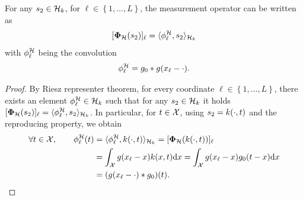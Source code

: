 \documentclass[12pt]{article}
\begin{document}
            {
            \begin{proposition}
                \label{prop:phihh}
                For any $s_2 \in \mathcal{H}_k$, for $\ell \in \left\{ 1, \dots, L \right\}$, the measurement operator can be written as
                \begin{equation}
                    \label{eq:defPhihStar}
                    [\bm{\Phi}_\mathcal{H}(s_2)]_\ell = \langle \phi^\mathcal{H}_\ell, s_2 \rangle_{\mathcal{H}_k}
                \end{equation}
                with $\phi^\mathcal{H}_\ell$ being the convolution
                \begin{equation*}
                    \phi^\mathcal{H}_\ell = g_0 * g(x_\ell - \cdot).
                \end{equation*}
            \end{proposition}
            \begin{proof}
                

                By Riesz representer theorem, for every coordinate  $\ell \in \left\{1, \dots, L \right\}$, there exists an element $\phi^\mathcal{H}_\ell \in \mathcal{H}_k$ such that for any $s_2 \in \mathcal{H}_k$ it holds $[\bm{\Phi}_\mathcal{H}(s_2)]_\ell = \langle \phi^\mathcal{H}_\ell , s_2 \rangle_{\mathcal{H}_k}$. In particular, for $t \in \mathcal{X}$, using $s_2 = k(\cdot, t)$ and the reproducing property, we obtain
                \begin{align*}
                    \forall t \in \mathcal{X}, \qquad \phi^\mathcal{H}_\ell(t)
                    &= \langle \phi^\mathcal{H}_\ell, k(\cdot, t) \rangle_{\mathcal{H}_k} = [\bm{\Phi}_\mathcal{H}(k(\cdot, t))]_\ell \\
                    & = \int_{\mathcal{X}} g(x_\ell - x) k(x, t) \mathrm{d}x = \int_{\mathcal{X}} g(x_\ell - x) g_0(t - x) \mathrm{d}x \\
                    & = (g(x_\ell - \cdot) * g_0)(t).
                \end{align*}   
            \end{proof}
            }
            
\end{document}
